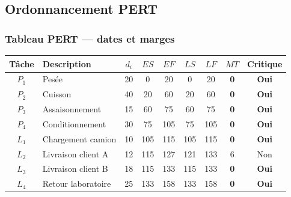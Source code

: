 \documentclass[12pt,a4paper]{article}
\begin{document}
\newpage

\subsection{Ordonnancement PERT}

\subsubsection{Tableau PERT — dates et marges}

\begin{center}\small
\setlength{\tabcolsep}{5pt}
\renewcommand{\arraystretch}{1.2}
\begin{tabular}{clccccccc}
\arrayrulecolor{SlateMid}
\toprule
\rowcolor{NavyDark}
{\color{white}\textbf{Tâche}} &
{\color{white}\textbf{Description}} &
{\color{white}$d_i$} &
{\color{white}$ES$} & {\color{white}$EF$} &
{\color{white}$LS$} & {\color{white}$LF$} &
{\color{white}$MT$} &
{\color{white}\textbf{Critique}}\\
\midrule
$P_1$ & Pesée                & 20 & 0   & 20  & 0   & 20  & \cellcolor{AccentRed!20}\textbf{0} & \cellcolor{AccentRed!20}\textcolor{AccentRed}{\textbf{Oui}}\\
$P_2$ & Cuisson              & 40 & 20  & 60  & 20  & 60  & \cellcolor{AccentRed!20}\textbf{0} & \cellcolor{AccentRed!20}\textcolor{AccentRed}{\textbf{Oui}}\\
$P_3$ & Assaisonnement       & 15 & 60  & 75  & 60  & 75  & \cellcolor{AccentRed!20}\textbf{0} & \cellcolor{AccentRed!20}\textcolor{AccentRed}{\textbf{Oui}}\\
$P_4$ & Conditionnement      & 30 & 75  & 105 & 75  & 105 & \cellcolor{AccentRed!20}\textbf{0} & \cellcolor{AccentRed!20}\textcolor{AccentRed}{\textbf{Oui}}\\
$L_1$ & Chargement camion    & 10 & 105 & 115 & 105 & 115 & \cellcolor{AccentRed!20}\textbf{0} & \cellcolor{AccentRed!20}\textcolor{AccentRed}{\textbf{Oui}}\\
\rowcolor{SlateLight}
$L_2$ & Livraison client A   & 12 & 115 & 127 & 121 & 133 & 6 & Non\\
$L_3$ & Livraison client B   & 18 & 115 & 133 & 115 & 133 & \cellcolor{AccentRed!20}\textbf{0} & \cellcolor{AccentRed!20}\textcolor{AccentRed}{\textbf{Oui}}\\
$L_4$ & Retour laboratoire   & 25 & 133 & 158 & 133 & 158 & \cellcolor{AccentRed!20}\textbf{0} & \cellcolor{AccentRed!20}\textcolor{AccentRed}{\textbf{Oui}}\\
\bottomrule
\end{tabular}
\end{center}
\end{document}
